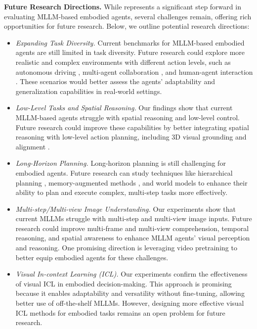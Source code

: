 \textbf{Future Research Directions.}
While \name represents a significant step forward in evaluating MLLM-based embodied agents, several challenges remain, offering rich opportunities for future research. Below, we outline potential research directions:
\begin{itemize}
    \item \emph{Expanding Task Diversity.} Current benchmarks for MLLM-based embodied agents are still limited in task diversity. Future research could explore more realistic and complex environments with different action levels, such as autonomous driving \cite{gulino2024waymax,ma2024lampilot,gao2024embodiedcity}, multi-agent collaboration \cite{liu2024heterogeneous}, and human-agent interaction \cite{chang2024partnr}. These scenarios would better assess the agents' adaptability and generalization capabilities in real-world settings. 
    \item \emph{Low-Level Tasks and Spatial Reasoning.} Our findings show that current MLLM-based agents struggle with spatial reasoning and low-level control. Future research could improve these capabilities by better integrating spatial reasoning with low-level action planning, including 3D visual grounding \cite{chen2024spatialvlm,cheng2024spatialrgpt} and alignment \cite{ahn2022can,yang2024embodied}.
    \item  \emph{Long-Horizon Planning.} Long-horizon planning is still challenging for embodied agents.
    Future research can study techniques like hierarchical planning \cite{llm-planner,ajay2023compositional}, memory-augmented methods \cite{sarch2024helper}, and world models \cite{mazzaglia2024genrl} to enhance their ability to plan and execute complex, multi-step tasks more effectively.
    \item \emph{Multi-step/Multi-view Image Understanding.} Our experiments show that current MLLMs struggle with multi-step and multi-view image inputs. Future research could improve multi-frame and multi-view comprehension, temporal reasoning, and spatial awareness to enhance MLLM agents' visual perception and reasoning. One promising direction is leveraging video pretraining \cite{madan2024foundation,wang2024qwen2} to better equip embodied agents for these challenges.
    \item \emph{Visual In-context Learning (ICL).}
    Our experiments confirm the effectiveness of visual ICL \cite{zhou2024visual,sarch2024vlm} in embodied decision-making. This approach is promising because it enables adaptability and versatility without fine-tuning, allowing better use of off-the-shelf MLLMs. However, designing more effective visual ICL methods for embodied tasks remains an open problem for future research.

\end{itemize}
